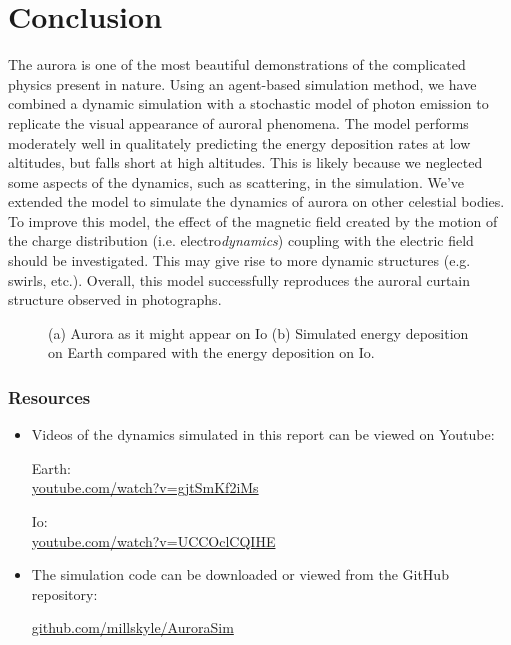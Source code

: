 \documentclass[twocolumn]{article}
\newcommand{\insertfigurewide}[3]{\begin{figure*}[bth]
\centering
	\makebox[\columnwidth][c]{
	\texttt{[image: \#1]}
	}
\caption{#3}
\label{#1}
\end{figure*}}
\begin{document}
\section*{Conclusion}
The aurora is one of the most beautiful demonstrations of the complicated physics present in nature.  Using an agent-based simulation method, we have combined a dynamic simulation with a stochastic model of photon emission to replicate the visual appearance of auroral phenomena.  The model performs moderately well in qualitately predicting the energy deposition rates at low altitudes, but falls short at high altitudes.  This is likely because we neglected some aspects of the dynamics, such as scattering, in the simulation.  We've extended the model to simulate the dynamics of aurora on other celestial bodies.  To improve this model, the effect of the magnetic field created by the motion of the charge distribution (i.e. electro\emph{dynamics}) coupling with the electric field should be investigated.  This may give rise to more dynamic structures (e.g. swirls, etc.).   Overall, this model successfully reproduces the auroral curtain structure observed in photographs. \insertfigurewide{../presentation/img/io_picture.pdf}{2.0}{(a) Aurora as it might appear on Io (b) Simulated energy deposition on Earth compared with the energy deposition on Io. }



\subsubsection*{Resources}

\begin{itemize}

\item Videos of the dynamics simulated in this report can be viewed on Youtube:

Earth:\\
\href{https://www.youtube.com/watch?v=gjtSmKf2iMs}{youtube.com/watch?v=gjtSmKf2iMs}

Io:\\
\href{https://www.youtube.com/watch?v=UCCOclCQIHE}{youtube.com/watch?v=UCCOclCQIHE}


\item The simulation code can be downloaded or viewed from the GitHub repository:

\href{https://github.com/millskyle/AuroraSim}{github.com/millskyle/AuroraSim}

\end{itemize}


\clearpage
{}



\end{document}

